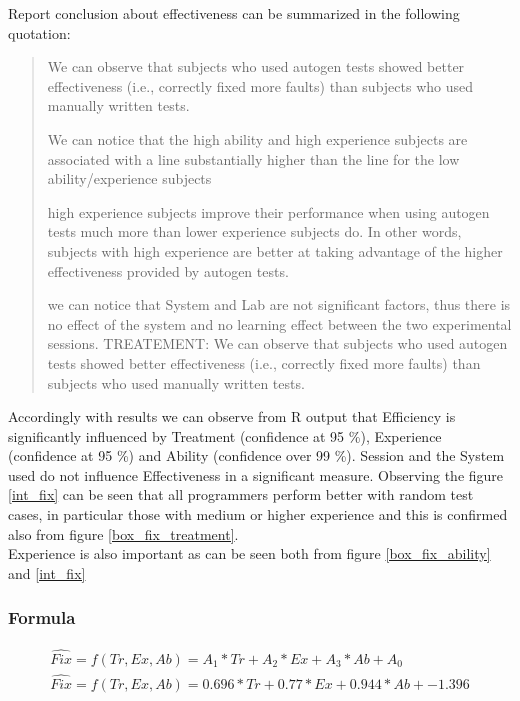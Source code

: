 Report conclusion about effectiveness can be summarized in the following quotation:
\begin{quote}
	\begin{itemize}
	 We can observe that subjects who used autogen tests showed better effectiveness (i.e., correctly fixed more faults) than subjects who used manually written tests.
	
	 We can notice that the high ability and high experience subjects are associated with a line substantially higher than the line for the low ability/experience subjects
	
	 high experience subjects improve their performance when using autogen tests much more than lower experience subjects do. In other words, subjects with high experience are better at taking advantage of the higher effectiveness provided by autogen tests.
	
	 we can notice that System and Lab are not significant factors, thus there is no effect
	of the system and no learning effect between the two experimental sessions.
	TREATEMENT: We can observe that subjects who used autogen tests showed better effectiveness (i.e., correctly fixed more faults) than subjects who used manually written tests.

	\end{itemize}
\end{quote}
Accordingly with results we can observe from R output that Efficiency is significantly influenced by Treatment (confidence at 95 \%), Experience (confidence at 95 \%) and Ability (confidence over 99 \%). Session and the System used do not influence Effectiveness in a significant measure. Observing the figure \ref{int_fix} can be seen that all programmers perform better with random test cases, in particular those with medium or higher experience and this is confirmed also from figure \ref{box_fix_treatment}.\\
Experience is also important as can be seen both from figure  \ref{box_fix_ability} and \ref{int_fix}

\subsubsection{Formula}
\begin{equation}
\begin{split}
	\hat{Fix} = f(Tr, Ex, Ab) = A_{1}*Tr + A_{2}*Ex + A_{3}*Ab + A_{0} \\
	\hat{Fix} = f(Tr, Ex, Ab) = 0.696*Tr + 0.77*Ex + 0.944*Ab + -1.396
\end{split}
\end{equation}

